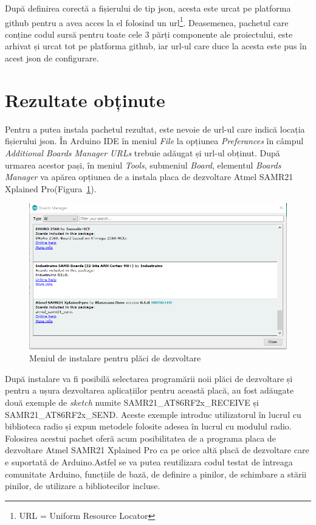 \documentclass[12pt,a4paper]{report}
\begin{document}
După definirea corectă a fișierului de tip json, acesta este urcat pe platforma github pentru a avea acces la el folosind un url\footnote{URL = Uniform Resource Locator}. Deasemenea, pachetul care conține codul sursă pentru toate cele 3 părți componente ale proiectului, este arhivat și urcat tot pe platforma github, iar url-ul care duce la acesta este pus în acest json de configurare.

\section{Rezultate obținute}
Pentru a putea instala pachetul rezultat, este nevoie de url-ul care indică locația fișierului json. În Arduino IDE în meniul \textit{File} la opțiunea \textit{Preferances} în câmpul \textit{Additional Boards Manager URLs} trebuie adăugat și url-ul obținut. După urmarea acestor pași, în meniul \textit{Tools}, submeniul \textit{Board}, elementul \textit{Boards Manager} va apărea opțiunea de a instala placa de dezvoltare Atmel SAMR21 Xplained Pro(Figura~\ref{fig:boardsmanager}).
\begin{figure}[!htb]
\centering
\includegraphics[scale=0.8]{pics/boardsmanager.png}
  \caption{Meniul de instalare pentru plăci de dezvoltare}
  \label{fig:boardsmanager}
\end{figure}

După instalare va fi posibilă selectarea programării noii plăci de dezvoltare și pentru a ușura dezvoltarea aplicațiilor pentru această placă, au fost adăugate două exemple de \textit{sketch} numite SAMR21\_AT86RF2x\_RECEIVE și SAMR21\_AT86RF2x\_SEND. Aceste exemple introduc utilizatorul în lucrul cu biblioteca radio și expun metodele folosite adesea în lucrul cu modulul radio.
Folosirea acestui pachet oferă acum posibilitatea de a programa placa de dezvoltare Atmel SAMR21 Xplained Pro ca pe orice altă placă de dezvoltare care e suportată de Arduino.Astfel se va putea reutilizara codul testat de întreaga comunitate Arduino, funcțiile de bază, de definire a pinilor, de schimbare a stării pinilor, de utilizare a bibliotecilor incluse.
\end{document}
